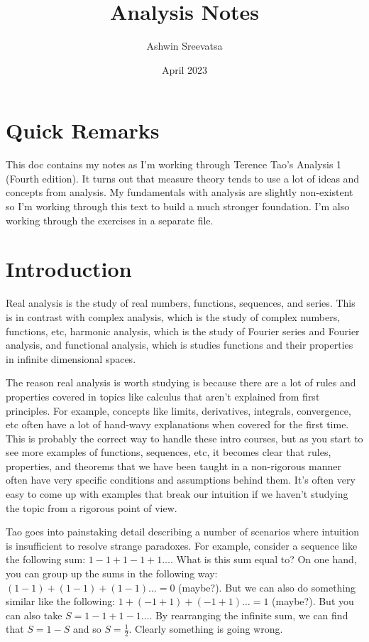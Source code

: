\documentclass[answers,12pt]{exam}
\title{Analysis Notes}
\author{Ashwin Sreevatsa}
\date{April 2023}
\begin{document}
\maketitle

\section*{Quick Remarks}
This doc contains my notes as I'm working through Terence Tao's Analysis 1 (Fourth edition).
It turns out that measure theory tends to use a lot of ideas and concepts from analysis.
My fundamentals with analysis are slightly non-existent so I'm working through this text to build a much stronger foundation.
I'm also working through the exercises in a separate file.


\section{Introduction}
Real analysis is the study of real numbers, functions, sequences, and series.
This is in contrast with complex analysis, which is the study of complex numbers, functions, etc, harmonic analysis, which is the study of Fourier series and Fourier analysis, and functional analysis, which is studies functions and their properties in infinite dimensional spaces.

The reason real analysis is worth studying is because there are a lot of rules and properties covered in topics like calculus that aren't explained from first principles.
For example, concepts like limits, derivatives, integrals, convergence, etc often have a lot of hand-wavy explanations when covered for the first time.
This is probably the correct way to handle these intro courses, but as you start to see more examples of functions, sequences, etc, it becomes clear that rules, properties, and theorems that we have been taught in a non-rigorous manner often have very specific conditions and assumptions behind them.
It's often very easy to come up with examples that break our intuition if we haven't studying the topic from a rigorous point of view.

Tao goes into painstaking detail describing a number of scenarios where intuition is insufficient to resolve strange paradoxes.
For example, consider a sequence like the following sum: $1 - 1 + 1 - 1 + 1 \dots$.
What is this sum equal to?
On one hand, you can group up the sums in the following way:
$(1 - 1) + (1 - 1) + (1 - 1) \dots = 0$ (maybe?).
But we can also do something similar like the following:
$1 + (-1 + 1) + (-1 + 1) \dots = 1$ (maybe?).
But you can also take $S = 1 - 1 + 1 - 1 \dots$.
By rearranging the infinite sum, we can find that $S = 1 - S$ and so $S = \frac{1}{2}$.
Clearly something is going wrong.
\end{document}
